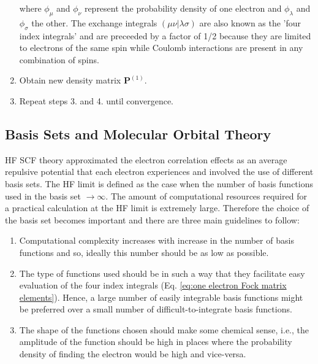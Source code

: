 \begin{enumerate}
\begin{equation}
                    \end{equation}
                    where $\phi_\mu$ and $\phi_\nu$ represent the probability density of one electron and $\phi_\lambda$ and $\phi_\sigma$ the other. The exchange integrals $(\mu \nu | \lambda \sigma)$ are also known as the 'four index integrals' and are preceeded by a factor of 1/2 because they are limited to electrons of the same spin while Coulomb interactions are present in any combination of spins.
                \item Obtain new density matrix $\mathbf{P}^{(1)}$.
                \item Repeat steps 3. and 4. until convergence.
            \end{enumerate}
            
        \subsection{Basis Sets and Molecular Orbital Theory}
       
            HF SCF theory approximated the electron correlation effects as an average repulsive potential that each electron experiences and involved the use of different basis sets. The HF limit is defined as the case when the number of basis functions used in the basis set $\to \infty$. The amount of computational resources required for a practical calculation at the HF limit is extremely large. Therefore the choice of the basis set becomes important and there are three main guidelines to follow:
            \begin{enumerate}
               \item Computational complexity increases with increase in the number of basis functions and so, ideally this number should be as low as possible.
               \item The type of functions used should be in such a way that they facilitate easy evaluation of the four index integrals (Eq. \eqref{eq:one electron Fock matrix elements}). Hence, a large number of easily integrable basis functions might be preferred over a small number of difficult-to-integrate basis functions.
               \item The shape of the functions chosen should make some chemical sense, i.e., the amplitude of the function should be high in places where the probability density of finding the electron would be high and vice-versa.
            \end{enumerate}


